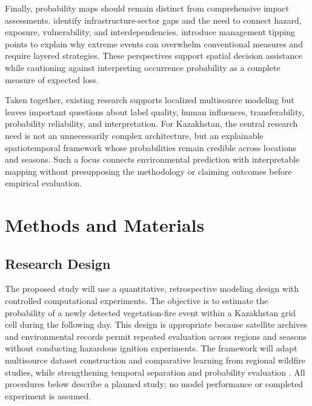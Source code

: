 \documentclass[pdflatex,sn-mathphys-num]{sn-jnl}
\begin{document}
Finally, probability maps should remain distinct from comprehensive impact assessments. \cite{dossi2026infrastructure} identify infrastructure-sector gaps and the need to connect hazard, exposure, vulnerability, and interdependencies. \cite{berchtold2025tipping} introduce management tipping points to explain why extreme events can overwhelm conventional measures and require layered strategies. These perspectives support spatial decision assistance while cautioning against interpreting occurrence probability as a complete measure of expected loss.

Taken together, existing research supports localized multisource modeling but leaves important questions about label quality, human influences, transferability, probability reliability, and interpretation. For Kazakhstan, the central research need is not an unnecessarily complex architecture, but an explainable spatiotemporal framework whose probabilities remain credible across locations and seasons. Such a focus connects environmental prediction with interpretable mapping without presupposing the methodology or claiming outcomes before empirical evaluation.

\section{Methods and Materials}\label{sec:methods}

\subsection{Research Design}

The proposed study will use a quantitative, retrospective modeling design with controlled computational experiments. The objective is to estimate the probability of a newly detected vegetation-fire event within a Kazakhstan grid cell during the following day. This design is appropriate because satellite archives and environmental records permit repeated evaluation across regions and seasons without conducting hazardous ignition experiments. The framework will adapt multisource dataset construction and comparative learning from regional wildfire studies, while strengthening temporal separation and probability evaluation \cite{jadouli2024morocco,ouazri2026catboost,babu2025sfri}. All procedures below describe a planned study; no model performance or completed experiment is assumed.
\end{document}
